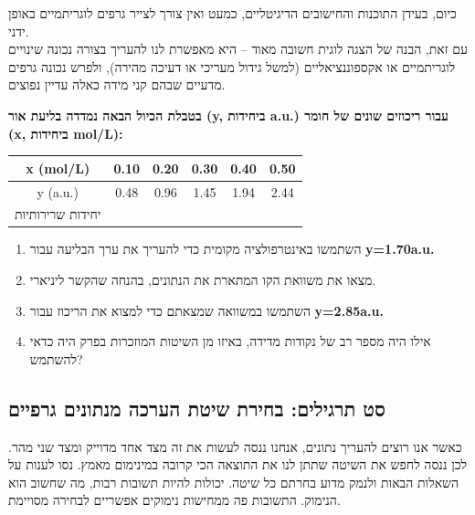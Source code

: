 \documentclass[
  hebrew,
  letterpaper,
  DIV=11,
  numbers=noendperiod]{scrreprt}
\providecommand{\tightlist}{%
  \setlength{\itemsep}{0pt}\setlength{\parskip}{0pt}}
\begin{document}
{כיום, בעידן התוכנות והחישובים הדיגיטליים, כמעט ואין צורך לצייר גרפים
לוגריתמיים באופן ידני}.\\
{עם זאת}, {הבנה של הצגה לוגית חשובה מאוד -- היא מאפשרת לנו להעריך בצורה
נכונה שינויים לוגריתמיים או אקספוננציאליים (למשל גידול מעריכי או דעיכה
מהירה), ולפרש נכונה גרפים מדעיים שבהם קני מידה כאלה עדיין נפוצים}.

\textbf{בטבלת הכיול הבאה נמדדה בליעת אור (y, ביחידות a.u.) עבור ריכוזים
שונים של חומר (x, ביחידות mol/L):}

\begin{longtable}[]{@{}cccccc@{}}
\toprule\noalign{}
x (mol/L) & \textbf{0.10} & \textbf{0.20} & \textbf{0.30} &
\textbf{0.40} & \textbf{0.50} \\
\midrule\noalign{}
\endhead
\bottomrule\noalign{}
\endlastfoot
y (a.u.) & 0.48 & 0.96 & 1.45 & 1.94 & 2.44 \\
יחידות שרירותיות & & & & & \\
\end{longtable}

\begin{enumerate}
\def\labelenumi{\arabic{enumi}.}
\tightlist
\item
  השתמשו באינטרפולציה מקומית כדי להעריך את ערך הבליעה עבור
  \textbf{y=1.70a.u.}\\
\item
  מצאו את משוואת הקו המתארת את הנתונים, בהנחה שהקשר ליניארי.\\
\item
  השתמשו במשוואה שמצאתם כדי למצוא את הריכוז עבור \textbf{y=2.85a.u.}\\
\item
  אילו היה מספר רב של נקודות מדידה, באיזו מן השיטות המוזכרות בפרק היה
  כדאי להשתמש?
\end{enumerate}

\subsection{סט תרגילים: בחירת שיטת הערכה מנתונים
גרפיים}\label{ux5e1ux5d8-ux5eaux5e8ux5d2ux5d9ux5dcux5d9ux5dd-ux5d1ux5d7ux5d9ux5e8ux5ea-ux5e9ux5d9ux5d8ux5ea-ux5d4ux5e2ux5e8ux5dbux5d4-ux5deux5e0ux5eaux5d5ux5e0ux5d9ux5dd-ux5d2ux5e8ux5e4ux5d9ux5d9ux5dd}

כאשר אנו רוצים להעריך נתונים, אנחנו ננסה לעשות את זה מצד אחד מדוייק ומצד
שני מהר. לכן ננסה לחפש את השיטה שתתן לנו את התוצאה הכי קרובה במינימום
מאמץ. נסו לענות על השאלות הבאות ולנמק מדוע בחרתם כל שיטה. יכולות להיות
תשובות רבות, מה שחשוב הוא הנימוק. התשובות פה ממחישות נימוקים אפשריים
לבחירה מסויימת.
\end{document}
